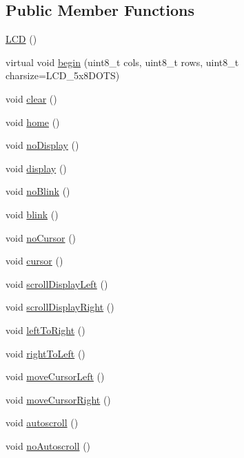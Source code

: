 \subsection*{Public Member Functions}
\begin{DoxyCompactItemize}
\item 
\hyperlink{class_l_c_d_a00bb2db1390721abc7b24ac4b8c276c8}{L\+C\+D} ()
\item 
virtual void \hyperlink{class_l_c_d_a3f587d1cbb2d59765ef60a5216b56fea}{begin} (uint8\+\_\+t cols, uint8\+\_\+t rows, uint8\+\_\+t charsize=L\+C\+D\+\_\+5x8\+D\+O\+T\+S)
\item 
void \hyperlink{class_l_c_d_afa699e0beeeee03cce8cef87eba81c4a}{clear} ()
\item 
void \hyperlink{class_l_c_d_aee45ad37f09312f5d9982257e2d37e68}{home} ()
\item 
void \hyperlink{class_l_c_d_af3974da6d988ba2d21c25135ada12108}{no\+Display} ()
\item 
void \hyperlink{class_l_c_d_a5b07cf05e8e5e7c53654f5ca0cf58b89}{display} ()
\item 
void \hyperlink{class_l_c_d_a3b755c4b397b5985752be8c30ee1a9b5}{no\+Blink} ()
\item 
void \hyperlink{class_l_c_d_a878b36878fa8287093964eba83aace77}{blink} ()
\item 
void \hyperlink{class_l_c_d_aec8ffaa1e69c7a6e13ac0cfbc29151d9}{no\+Cursor} ()
\item 
void \hyperlink{class_l_c_d_a194814f64dfa50a90e07e0fe0d361620}{cursor} ()
\item 
void \hyperlink{class_l_c_d_a6f3a503055b3b8dcf0f61b2633c584f7}{scroll\+Display\+Left} ()
\item 
void \hyperlink{class_l_c_d_abfc44b294772f09020bfa32af8a79571}{scroll\+Display\+Right} ()
\item 
void \hyperlink{class_l_c_d_a238e9f6476dc7df64af04eb6c87f6ac7}{left\+To\+Right} ()
\item 
void \hyperlink{class_l_c_d_ac014830eadc26bfd86308ea8734f4428}{right\+To\+Left} ()
\item 
void \hyperlink{class_l_c_d_aad2abc99d1aca5403873579d9d72c2d4}{move\+Cursor\+Left} ()
\item 
void \hyperlink{class_l_c_d_a09eec0c712e54b066f5894635c1fe75c}{move\+Cursor\+Right} ()
\item 
void \hyperlink{class_l_c_d_abb3ed88d530f6283e6159b4973e7da9e}{autoscroll} ()
\item 
void \hyperlink{class_l_c_d_a96035dde40efbf73390e00b5beb00231}{no\+Autoscroll} ()

\end{DoxyCompactItemize}

